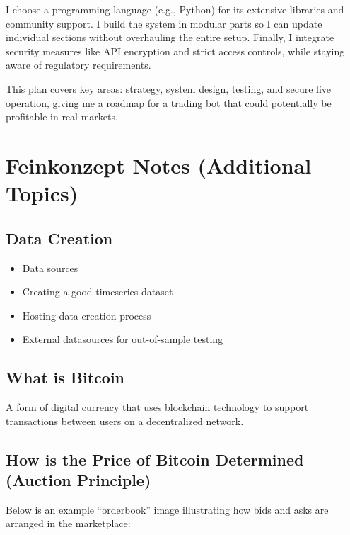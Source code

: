 \documentclass[9pt,a4paper,twocolumn,twoside]{tau-class/tau}
\begin{document}
I choose a programming language (e.g., Python) for its extensive libraries 
and community support. I build the system in modular parts so I can update 
individual sections without overhauling the entire setup. Finally, I 
integrate security measures like API encryption and strict access 
controls, while staying aware of regulatory requirements.

\noindent
This plan covers key areas: strategy, system design, testing, and secure 
live operation, giving me a roadmap for a trading bot that could potentially 
be profitable in real markets.

\section{Feinkonzept Notes (Additional Topics)}

\subsection{Data Creation}
\begin{itemize}
  \item Data sources
  \item Creating a good timeseries dataset
  \item Hosting data creation process
  \item External datasources for out-of-sample testing
\end{itemize}


\subsection{What is Bitcoin}
A form of digital currency that uses blockchain technology to support transactions between users on a decentralized network.

\subsection{How is the Price of Bitcoin Determined (Auction Principle)}

Below is an example “orderbook” image illustrating how bids and asks are 
arranged in the marketplace:
\end{document}

